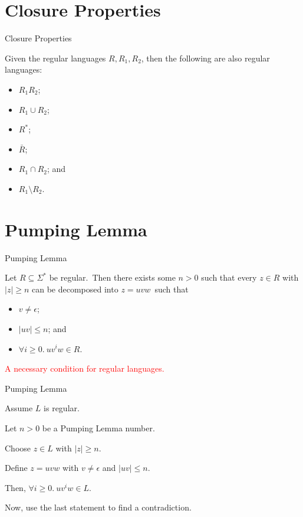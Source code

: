 \documentclass{beamer}
\def\r{\textcolor{red}}
\begin{document}
\section{Closure Properties}

\begin{frame}{Closure Properties}
    \begin{theorem}
        Given the regular languages $R, R_1, R_2$, then the following are also regular languages:\pause
        \begin{itemize}
            \item $R_1 R_2$\pause;
            \item $R_1 \cup R_2$\pause;
            \item $R^*$\pause;
            \item $\bar{R}$\pause;
            \item $R_1 \cap R_2$\pause; and
            \item $R_1 \setminus R_2$.
        \end{itemize}
    \end{theorem}
\end{frame}

\section{Pumping Lemma}

\begin{frame}{Pumping Lemma}
    \begin{theorem}
        Let $R \subseteq \Sigma^*$ be regular.\pause\ Then there exists some $n > 0$ such that every $z \in R$ with $|z| \geq n$ can be decomposed into $z = uvw$\pause\ such that
        \begin{itemize}
            \item $v \neq \epsilon$\pause;
            \item $|uv| \leq n$\pause; and
            \item $\forall i \geq 0.\ uv^iw \in R$.
        \end{itemize}
    \end{theorem}\pause
    \r{A necessary condition for regular languages.}
\end{frame}

\begin{frame}{Pumping Lemma}
    \begin{example}
        Assume $L$ is regular.\par
        Let $n > 0$ be a Pumping Lemma number.\pause\par
        Choose $z \in L$ with $|z| \geq n$.\par
        Define $z = uvw$ with $v \neq \epsilon$ and $|uv| \leq n$.\pause\par
        Then, $\forall i \geq 0.\ uv^iw \in L$.\pause\par
        Now, use the last statement to find a contradiction.
    \end{example}
\end{frame}
\end{document}
